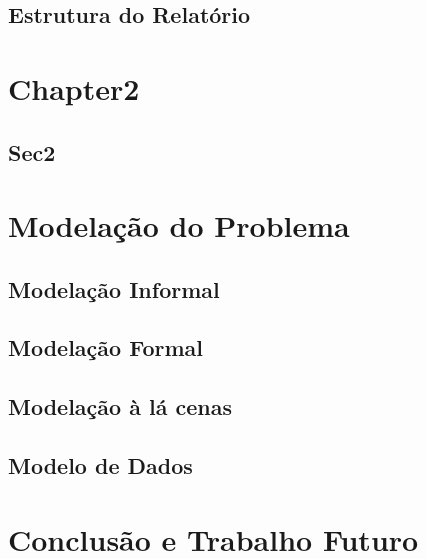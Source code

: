 \documentclass[english,a4paper]{report}
\begin{document}
\section{Estrutura do Relatório}

\newpage
\chapter{Chapter2} \label{chap xxx}

\section{Sec2}
\label{sec yyy}
\newpage
\chapter{Modelação do Problema} \label{chap modprob}

\section{Modelação Informal}
\label{sec modinf}
\section{Modelação Formal}
\label{sec modfor}
\section{Modelação à lá cenas}
\label{sec modcenas}
\section{Modelo de Dados}
\label{sec modedados}
\newpage
\chapter{Conclusão e Trabalho Futuro}\label{chap con} 

\newpage

%

\end{document}
